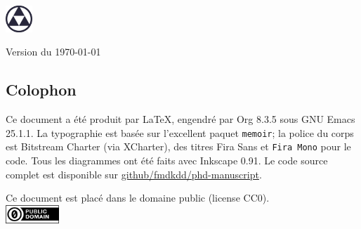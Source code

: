 \vspace{3cm}
\begin{flushright}
{\large\theauthor}
\end{flushright}

\vfill
\begin{center}
\includegraphics[width=1cm]{img/logo}
\end{center}

\vfill
\begin{center}
Version \versiontag{} du \today
\end{center}


\cleartoverso
\phantom{a}                     %
\vfill
\begin{minipage}{26pc}
\subsection*{Colophon}
Ce document a été produit par \LaTeX{}, engendré par Org 8.3.5 sous GNU Emacs
25.1.1.  La typographie est basée sur l'excellent paquet \texttt{memoir}; la
police du corps est Bitstream Charter (via XCharter), des titres \textsf{Fira
Sans} et \texttt{Fira Mono} pour le code.  Tous les diagrammes ont été faits
avec Inkscape 0.91.  Le code source complet est disponible sur
\href{https://github.com/fmdkdd/phd-manuscript}{github/fmdkdd/phd-manuscript}.

\vfill
\begin{center}
Ce document est placé dans le domaine public (license CC0).\\
\vspace{4pt}
\includegraphics[width=2cm]{img/cc-zero.png}
\end{center}
\end{minipage}


